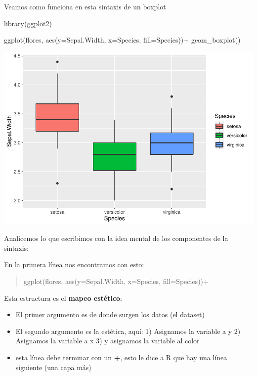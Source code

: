 \documentclass[
]{book}
\newenvironment{Shaded}{\begin{snugshade}}{\end{snugshade}}
\newcommand{\AttributeTok}[1]{\textcolor[rgb]{0.77,0.63,0.00}{#1}}
\newcommand{\FunctionTok}[1]{\textcolor[rgb]{0.00,0.00,0.00}{#1}}
\newcommand{\NormalTok}[1]{#1}
\newcommand{\SpecialCharTok}[1]{\textcolor[rgb]{0.00,0.00,0.00}{#1}}
\begin{document}
Veamos como funciona en esta sintaxis de un boxplot

\begin{Shaded}
\begin{Highlighting}[]
\FunctionTok{library}\NormalTok{(ggplot2)}

\FunctionTok{ggplot}\NormalTok{(flores, }\FunctionTok{aes}\NormalTok{(}\AttributeTok{y=}\NormalTok{Sepal.Width, }\AttributeTok{x=}\NormalTok{Species, }\AttributeTok{fill=}\NormalTok{Species))}\SpecialCharTok{+}
  \FunctionTok{geom\_boxplot}\NormalTok{()}
\end{Highlighting}
\end{Shaded}

\includegraphics{Esatadistica_en_R_files/figure-latex/unnamed-chunk-142-1.pdf}

Analicemos lo que escribimos con la idea mental de los componentes de la sintaxis:

En la primera línea nos encontramos con esto:

\begin{quote}
ggplot(flores, aes(y=Sepal.Width, x=Species, fill=Species))+
\end{quote}

Esta estructura es el \textbf{mapeo estético}:

\begin{itemize}
\item
  El primer argumento es de donde surgen los datos (el dataset)
\item
  El segundo argumento es la estética, aquí: 1) Asignamos la variable a y 2) Asignamos la variable a x 3) y asignamos la variable al color
\item
  esta línea debe terminar con un \textbf{+}, esto le dice a R que hay una línea siguiente (una capa más)
\end{itemize}
\end{document}
